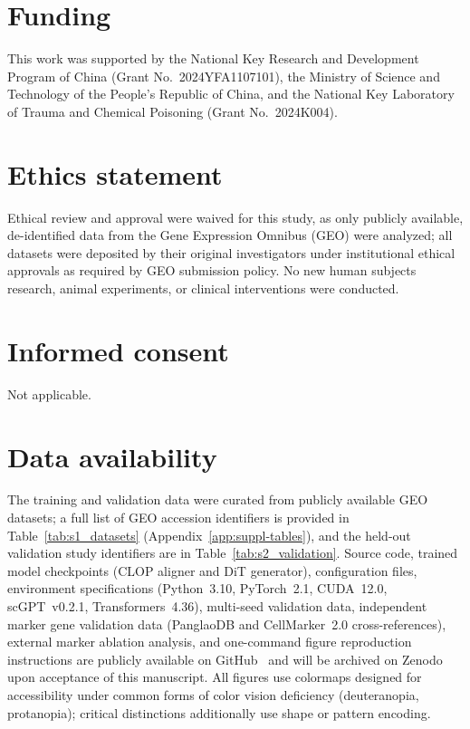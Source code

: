 \documentclass[preprint,12pt]{elsarticle}
\begin{document}
        \section*{Funding}
        This work was supported by the National Key Research and Development Program of China (Grant No.~2024YFA1107101), the Ministry of Science and Technology of the People's Republic of China, and the National Key Laboratory of Trauma and Chemical Poisoning (Grant No.~2024K004).

        \section*{Ethics statement}
        Ethical review and approval were waived for this study, as only publicly available, de-identified data from the Gene Expression Omnibus (GEO) were analyzed; all datasets were deposited by their original investigators under institutional ethical approvals as required by GEO submission policy. No new human subjects research, animal experiments, or clinical interventions were conducted.

        \section*{Informed consent}
        Not applicable.

        \section*{Data availability}
        The training and validation data were curated from publicly available GEO datasets; a full list of GEO accession identifiers is provided in Table~\ref{tab:s1_datasets} (Appendix~\ref{app:suppl-tables}), and the held-out validation study identifiers are in Table~\ref{tab:s2_validation}. Source code, trained model checkpoints (CLOP aligner and DiT generator), configuration files, environment specifications (Python~3.10, PyTorch~2.1, CUDA~12.0, scGPT~v0.2.1, Transformers~4.36), multi-seed validation data, independent marker gene validation data (PanglaoDB and CellMarker~2.0 cross-references), external marker ablation analysis, and one-command figure reproduction instructions are publicly available on GitHub~\cite{ref-clop-dit} and will be archived on Zenodo upon acceptance of this manuscript. All figures use colormaps designed for accessibility under common forms of color vision deficiency (deuteranopia, protanopia); critical distinctions additionally use shape or pattern encoding.
\end{document}

